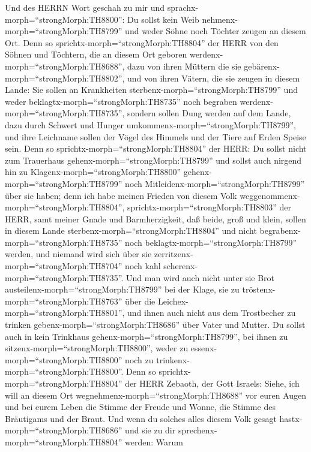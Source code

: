  Und des HERRN Wort geschah zu mir und
sprachx-morph=``strongMorph:TH8800'':  Du sollst kein Weib
nehmenx-morph=``strongMorph:TH8799'' und weder Söhne noch Töchter zeugen
an diesem Ort.  Denn so
sprichtx-morph=``strongMorph:TH8804'' der HERR von den Söhnen und
Töchtern, die an diesem Ort geboren
werdenx-morph=``strongMorph:TH8688'', dazu von ihren Müttern die sie
gebärenx-morph=``strongMorph:TH8802'', und von ihren Vätern, die sie
zeugen in diesem Lande:  Sie sollen an Krankheiten
sterbenx-morph=``strongMorph:TH8799'' und weder
beklagtx-morph=``strongMorph:TH8735'' noch begraben
werdenx-morph=``strongMorph:TH8735'', sondern sollen Dung werden auf dem
Lande, dazu durch Schwert und Hunger
umkommenx-morph=``strongMorph:TH8799'', und ihre Leichname sollen der
Vögel des Himmels und der Tiere auf Erden Speise sein.  Denn
so sprichtx-morph=``strongMorph:TH8804'' der HERR: Du sollst nicht zum
Trauerhaus gehenx-morph=``strongMorph:TH8799'' und sollst auch nirgend
hin zu Klagenx-morph=``strongMorph:TH8800''
gehenx-morph=``strongMorph:TH8799'' noch
Mitleidenx-morph=``strongMorph:TH8799'' über sie haben; denn ich habe
meinen Frieden von diesem Volk
weggenommenx-morph=``strongMorph:TH8804'',
sprichtx-morph=``strongMorph:TH8803'' der HERR, samt meiner Gnade und
Barmherzigkeit,  daß beide, groß und klein, sollen in diesem
Lande sterbenx-morph=``strongMorph:TH8804'' und nicht
begrabenx-morph=``strongMorph:TH8735'' noch
beklagtx-morph=``strongMorph:TH8799'' werden, und niemand wird sich über
sie zerritzenx-morph=``strongMorph:TH8704'' noch kahl
scherenx-morph=``strongMorph:TH8735''.  Und man wird auch
nicht unter sie Brot austeilenx-morph=``strongMorph:TH8799'' bei der
Klage, sie zu tröstenx-morph=``strongMorph:TH8763'' über die
Leichex-morph=``strongMorph:TH8801'', und ihnen auch nicht aus dem
Trostbecher zu trinken gebenx-morph=``strongMorph:TH8686'' über Vater
und Mutter.  Du sollst auch in kein Trinkhaus
gehenx-morph=``strongMorph:TH8799'', bei ihnen zu
sitzenx-morph=``strongMorph:TH8800'', weder zu
essenx-morph=``strongMorph:TH8800'' noch zu
trinkenx-morph=``strongMorph:TH8800''.  Denn so
sprichtx-morph=``strongMorph:TH8804'' der HERR Zebaoth, der Gott
Israels: Siehe, ich will an diesem Ort
wegnehmenx-morph=``strongMorph:TH8688'' vor euren Augen und bei eurem
Leben die Stimme der Freude und Wonne, die Stimme des Bräutigams und der
Braut.  Und wenn du solches alles diesem Volk gesagt
hastx-morph=``strongMorph:TH8686'' und sie zu dir
sprechenx-morph=``strongMorph:TH8804'' werden: Warum
